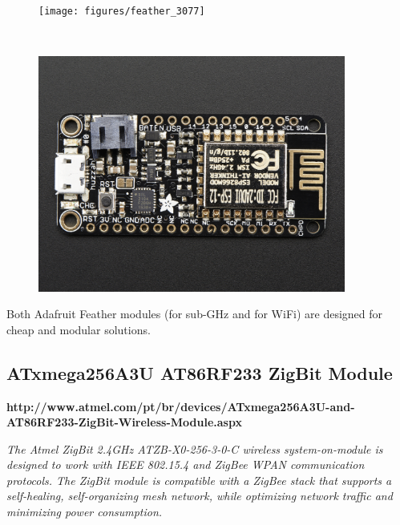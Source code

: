 
\vspace{-1em}
\begin{figure}[h!]
	\centering
	\begin{minipage}{.47\textwidth}
		\centering

		\texttt{[image: figures/feather\_3077]}

		\label{fig:test3}
	\end{minipage}%
	\begin{minipage}{.05\textwidth}
		\centering
		~
	\end{minipage}%
	\begin{minipage}{.47\textwidth}
		\centering
		\includegraphics[width=0.90\textwidth,keepaspectratio]{figures/feather_wifi}
		\label{fig:test4}
	\end{minipage}
\end{figure}

Both Adafruit Feather modules (for sub-GHz and for WiFi) are designed for cheap and modular solutions.

\subsection{ATxmega256A3U AT86RF233 ZigBit Module}
\begin{mdframed}[	linecolor=black, outerlinewidth=5pt]
 \textbf{http://www.atmel.com/pt/br/devices/\footnotesize{ATxmega256A3U-and-AT86RF233-ZigBit-Wireless-Module.aspx} }
	
	\small
	\textit{The Atmel ZigBit 2.4GHz ATZB-X0-256-3-0-C wireless system-on-module is designed to work with IEEE 802.15.4 and ZigBee WPAN communication protocols. The ZigBit module is compatible with a ZigBee stack that supports a self-healing, self-organizing mesh network, while optimizing network traffic and minimizing power consumption.}	
\end{mdframed}


